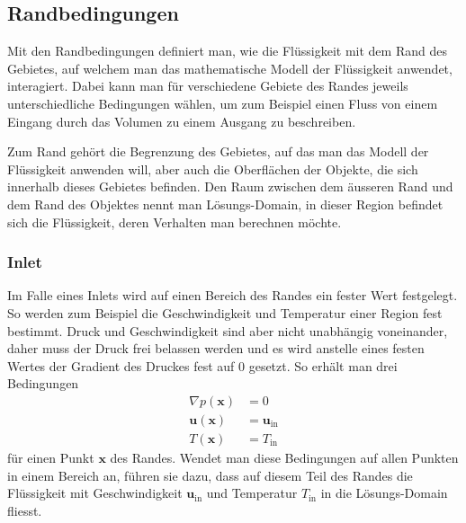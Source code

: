\subsection{Randbedingungen}
\label{openfoam:randbedingungen}
Mit den Randbedingungen definiert man, wie die Flüssigkeit mit dem Rand des Gebietes, auf welchem man das mathematische Modell der Flüssigkeit anwendet, interagiert.
Dabei kann man für verschiedene Gebiete des Randes jeweils unterschiedliche Bedingungen wählen, um zum Beispiel einen Fluss von einem Eingang durch das Volumen zu einem Ausgang zu beschreiben.

Zum Rand gehört die Begrenzung des Gebietes, auf das man das Modell der Flüssigkeit anwenden will, aber auch die Oberflächen der Objekte, die sich innerhalb dieses Gebietes befinden.
Den Raum zwischen dem äusseren Rand und dem Rand des Objektes nennt man Lösungs-Domain, in dieser Region befindet sich die Flüssigkeit, deren Verhalten man berechnen möchte.
%

\subsubsection{Inlet}
%
Im Falle eines Inlets wird auf einen Bereich des Randes ein fester Wert festgelegt. 
So werden zum Beispiel die Geschwindigkeit und Temperatur einer Region fest bestimmt.
Druck und Geschwindigkeit sind aber nicht unabhängig voneinander, daher muss der Druck frei belassen werden und es wird anstelle eines festen Wertes der Gradient des Druckes fest auf 0 gesetzt.
So erhält man drei Bedingungen 
\begin{align*}
 \nabla p(\mathbf{x}) &= 0 \\
 \mathbf{u}(\mathbf{x}) &= \mathbf{u}_{\text{in}} \\
 T(\mathbf{x}) &= T_{\text{in}}
\end{align*}
für einen Punkt $\mathbf{x}$ des Randes.
Wendet man diese Bedingungen auf allen Punkten in einem Bereich an, führen sie dazu, dass auf diesem Teil des Randes die Flüssigkeit mit Geschwindigkeit $\mathbf{u}_{\text{in}}$ und Temperatur $T_{\text{in}}$ in die Lösungs-Domain fliesst.

